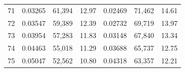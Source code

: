 \begin{tabular}{cccc|ccc}
71   & 0.03265                                                          & 61,394                                                                                            & 12.97                                                                                                                      & 0.02469                                                          & 71,462                                                                                            & 14.61                                                                                                                      \\
72   & 0.03547                                                          & 59,389                                                                                            & 12.39                                                                                                                      & 0.02732                                                          & 69,719                                                                                            & 13.97                                                                                                                      \\
73   & 0.03954                                                          & 57,283                                                                                            & 11.83                                                                                                                      & 0.03148                                                          & 67,840                                                                                            & 13.34                                                                                                                      \\
74   & 0.04463                                                          & 55,018                                                                                            & 11.29                                                                                                                      & 0.03688                                                          & 65,737                                                                                            & 12.75                                                                                                                      \\
75   & 0.05047                                                          & 52,562                                                                                            & 10.80                                                                                                                      & 0.04318                                                          & 63,357                                                                                            & 12.21                                                                                                                      \\

\end{tabular}
